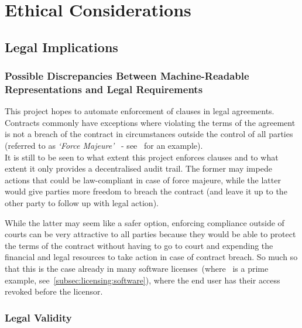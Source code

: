 
\chapter{Ethical Considerations}\label{ch:ethical}


\section{Legal Implications}\label{sec:legal-implications}

\subsection{Possible Discrepancies Between Machine-Readable Representations and Legal Requirements}
\label{subsec:legal-discrepancies}

This project hopes to automate enforcement of clauses in legal agreements.
Contracts commonly have exceptions where violating the terms of the agreement is not a breach of the contract in
circumstances outside the control of all parties (referred to as \textit{`Force Majeure'}~\cite{forceMajeureDefinition} -
see~\cite[]{jetbrainsEduLicence} for an example).\\

It is still to be seen to what extent this project enforces clauses and to what extent it only provides
a decentralised audit trail.
The former may impede actions that could be law-compliant in case of force majeure, while the latter
would give parties more freedom to breach the contract (and leave it up to the other party to follow up with legal
action).

While the latter may seem like a safer option, enforcing compliance outside of courts can be very attractive to all
parties because they would be able to protect the terms of the contract without having to go to court and expending the
financial and legal resources to take action in case of contract breach.
So much so that this is the case already in many software licenses~(where~\cite{jetbrainsEduLicence} is a prime example,
see~\ref{subsec:licensing:software}), where the end user has their access revoked before the licensor.


\subsection{Legal Validity}

